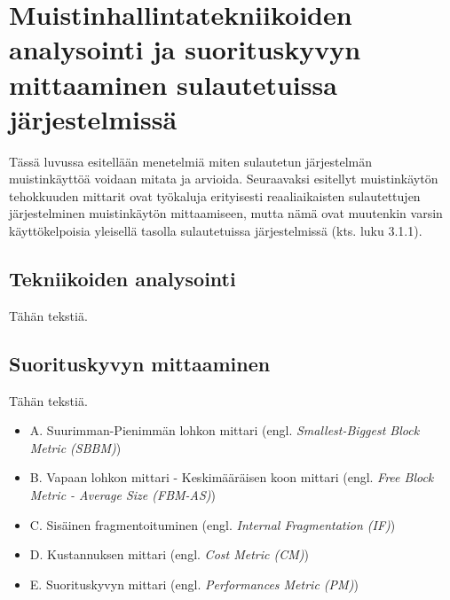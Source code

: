 \chapter{Muistinhallintatekniikoiden analysointi ja suorituskyvyn mittaaminen sulautetuissa järjestelmissä} \label{Kuudes luku}

Tässä luvussa esitellään menetelmiä miten sulautetun järjestelmän muistinkäyttöä voidaan mitata ja arvioida. Seuraavaksi esitellyt muistinkäytön tehokkuuden mittarit ovat työkaluja erityisesti reaaliaikaisten sulautettujen järjestelminen muistinkäytön mittaamiseen, mutta nämä ovat muutenkin varsin käyttökelpoisia yleisellä tasolla sulautetuissa järjestelmissä (kts. luku 3.1.1).

\section{Tekniikoiden analysointi}

Tähän tekstiä.

\section{Suorituskyvyn mittaaminen}

Tähän tekstiä.\cite{tmtt@2006}

\begin{itemize}
\item{A. Suurimman-Pienimmän lohkon mittari                           (engl. \textit{Smallest-Biggest Block Metric (SBBM)})}
\item{B. Vapaan lohkon mittari - Keskimääräisen koon mittari          (engl. \textit{Free Block Metric - Average Size (FBM-AS)})}
\item{C. Sisäinen fragmentoituminen                                   (engl. \textit{Internal Fragmentation (IF)})}
\item{D. Kustannuksen mittari                                         (engl. \textit{Cost Metric (CM)})}
\item{E. Suorituskyvyn mittari                                        (engl. \textit{Performances Metric (PM)})}
\end{itemize}

